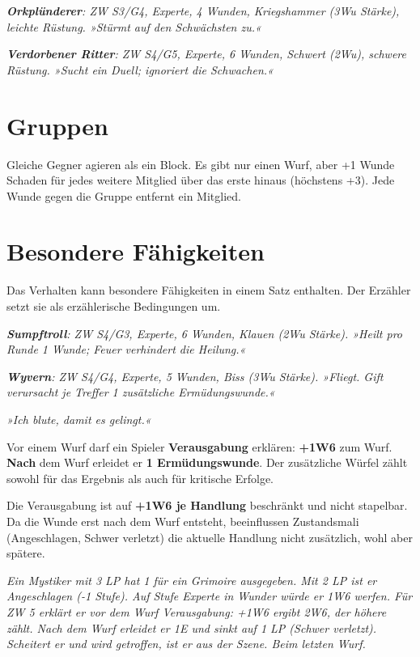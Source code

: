 \documentclass[10pt,a4paper]{article}
\begin{document}
\begingroup\setlength{\emergencystretch}{1em}\textbf{\textit{Orkplünderer}}\textit{: ZW S3/G4, Experte, 4 Wunden, Kriegshammer (3Wu Stärke), leichte Rüstung. »Stürmt auf den Schwächsten zu.«}\par\endgroup

\textbf{\textit{Verdorbener Ritter}}\textit{: ZW S4/G5, Experte, 6 Wunden, Schwert (2Wu), schwere Rüstung. »Sucht ein Duell; ignoriert die Schwachen.«}

\section*{Gruppen}
Gleiche Gegner agieren als ein Block. Es gibt nur einen Wurf, aber +1 Wunde Schaden für jedes weitere Mitglied über das erste hinaus (höchstens +3). Jede Wunde gegen die Gruppe entfernt ein Mitglied.

\section*{Besondere Fähigkeiten}
Das Verhalten kann besondere Fähigkeiten in einem Satz enthalten. Der Erzähler setzt sie als erzählerische Bedingungen um.

\textbf{\textit{Sumpftroll}}\textit{: ZW S4/G3, Experte, 6 Wunden, Klauen (2Wu Stärke). »Heilt pro Runde 1 Wunde; Feuer verhindert die Heilung.«}

\textbf{\textit{Wyvern}}\textit{: ZW S4/G4, Experte, 5 Wunden, Biss (3Wu Stärke). »Fliegt. Gift verursacht je Treffer 1 zusätzliche Ermüdungswunde.«}

\textit{»Ich blute, damit es gelingt.«}

Vor einem Wurf darf ein Spieler \textbf{Verausgabung} erklären: \textbf{+1W6} zum Wurf. \textbf{Nach} dem Wurf erleidet er \textbf{1 Ermüdungswunde}. Der zusätzliche Würfel zählt sowohl für das Ergebnis als auch für kritische Erfolge.

Die Verausgabung ist auf \textbf{+1W6 je Handlung} beschränkt und nicht stapelbar. Da die Wunde erst nach dem Wurf entsteht, beeinflussen Zustandsmali (Angeschlagen, Schwer verletzt) die aktuelle Handlung nicht zusätzlich, wohl aber spätere.

\textit{Ein Mystiker mit 3 LP hat 1 für ein Grimoire ausgegeben. Mit 2 LP ist er Angeschlagen (-1 Stufe). Auf Stufe Experte in Wunder würde er 1W6 werfen. Für ZW 5 erklärt er vor dem Wurf Verausgabung: +1W6 ergibt 2W6, der höhere zählt. Nach dem Wurf erleidet er 1E und sinkt auf 1 LP (Schwer verletzt). Scheitert er und wird getroffen, ist er aus der Szene. Beim letzten Wurf.}
\end{document}
